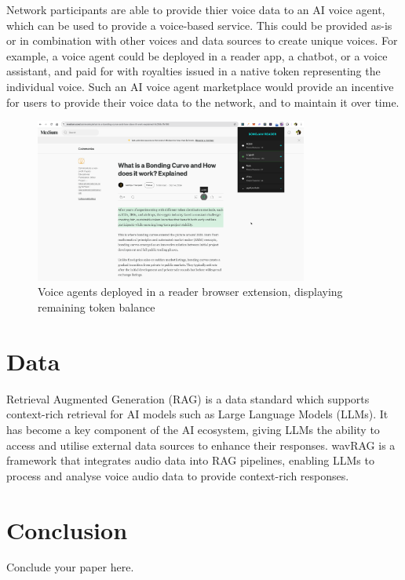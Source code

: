 \documentclass[11pt,a4paper]{article}
\begin{document}
Network participants are able to provide thier voice data to an AI voice agent, which can be used to provide a voice-based service.
This could be provided \textquotesingle as-is\textquotesingle{} or in combination with other voices and data sources to create unique voices.
For example, a voice agent could be deployed in a reader app, a chatbot, or a voice assistant, and paid for with royalties issued in a native token representing the individual voice.
Such an AI voice agent marketplace would provide an incentive for users to provide their voice data to the network, and to maintain it over time.

\begin{figure}[H]
    \centering
    \includegraphics[width=0.8\textwidth]{reader.png}
    \caption{Voice agents deployed in a reader browser extension, displaying remaining token balance}
    \label{fig:reader}
\end{figure}

\section{Data}
\label{sec:discussion}
Retrieval Augmented Generation (RAG) is a data standard which supports context-rich retrieval for AI models such as Large Language Models (LLMs).
It has become a key component of the AI ecosystem, giving LLMs the ability to access and utilise external data sources to enhance their responses.
wavRAG is a framework that integrates audio data into RAG pipelines, enabling LLMs to process and analyse voice audio data to provide context-rich responses.

\section{Conclusion}
\label{sec:conclusion}
Conclude your paper here.



\end{document}
